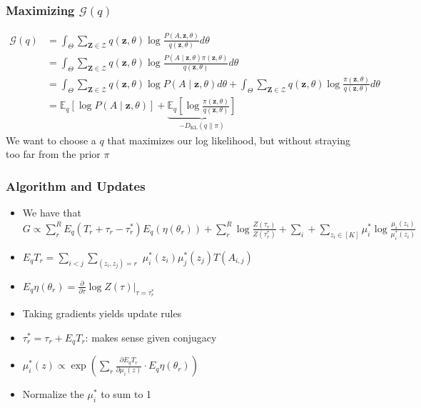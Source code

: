 \documentclass{beamer}
\newcommand{\1}{\mathbbm{1}}
\newcommand{\V}[1]{\ensuremath{\boldsymbol{#1}}} %
\begin{document}
\begin{frame}
  \frametitle{Maximizing $\mathcal{G}(q)$}
  \begin{align*}
  \mathcal{G}(q) &= \int_{\Theta} \sum_{\V{Z} \in \mathcal{Z}} q(\V{z}, \theta) \log \frac{P(A, \V{z}, \theta)}{q(\V{z},\theta)} d\theta \\
                 &= \int_{\Theta} \sum_{\V{Z} \in \mathcal{Z}} q(\V{z}, \theta) \log \frac{P(A \mid \V{z}, \theta) \pi(\V{z}, \theta)}{q(\V{z},\theta)} d\theta \\
                 &= \int_{\Theta} \sum_{\V{Z} \in \mathcal{Z}} q(\V{z}, \theta) \log P(A \mid \V{z}, \theta) d\theta + \int_{\Theta} \sum_{\V{Z} \in \mathcal{Z}} q(\V{z}, \theta) \log \frac{\pi(\V{z}, \theta)}{q(\V{z},\theta)}  d\theta \\
    &= \mathbb{E}_q \left[ \log P(A \mid \V{z}, \theta) \right] + \underbrace{\mathbb{E}_q \left[ \log \frac{\pi(\V{z}, \theta)}{q(\V{z}, \theta)} \right]}_{-D_{\text{KL}}(q \parallel \pi)}
  \end{align*}
We want to choose a $q$ that maximizes our log likelihood, but without straying too far from the prior $\pi$
\end{frame}

\begin{frame}
  \frametitle{Algorithm and Updates}
  \begin{itemize}
  \item We have that $G \propto \sum_r^R  E_q (T_r + \tau_r - \tau_r^{*}) E_q(\eta(\theta_r)) + \sum_r^R \log \frac{Z(\tau_r)}{Z(\tau_r^{*})} + \sum_i + \sum_{z_i \in [K]} \mu_i^{*} \log \frac{\mu_i(z_i)}{\mu_i^{*}(z_i)}$
  \item $E_q T_r = \sum_{i < j} \sum_{(z_i, z_j) = r}$ $\mu_i^{*}(z_i) \mu_j^{*} (z_j) T(A_{i,j})$
  \item $E_q \eta(\theta_r) = \frac{\partial }{\partial {\tau}} \log Z({\tau}) \left. \right|_{\tau = \tau_r^{*}}$
  \item Taking gradients yields update rules
  \item $\tau_r^{*} = \tau_r + E_q T_r$: makes sense given conjugacy
  \item $\mu_i^{*}(z) \propto \exp \left( \sum_r \frac{\partial E_q T_r}{\partial \mu_i(z)} \cdot E_q \eta(\theta_r) \right)$
  \item Normalize the $\mu_i^{*}$ to sum to 1
  \end{itemize}
\end{frame}
\end{document}
